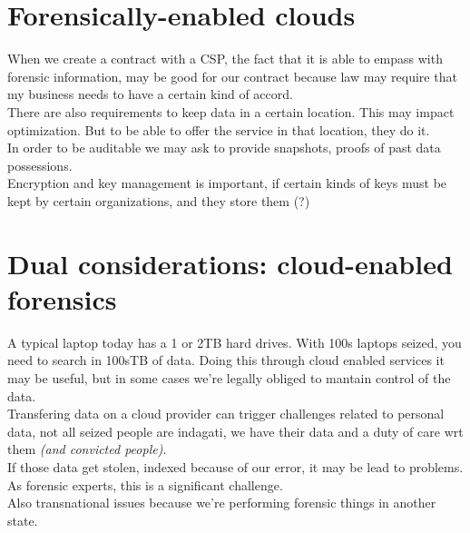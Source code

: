     \section{Forensically-enabled clouds}
        When we create a contract with a CSP, the fact that it is able to empass with forensic information, may be good for our contract because law may require that my business needs to have a certain kind of accord.\\
        There are also requirements to keep data in a certain location. This may impact optimization. But to be able to offer the service in that location, they do it.\\
        In order to be auditable we may ask to provide snapshots, proofs of past data possessions.\\
        Encryption and key management is important, if certain kinds of keys must be kept by certain organizations, and they store them (?)
    \section{Dual considerations: cloud-enabled forensics}
        A typical laptop today has a 1 or 2TB hard drives. With 100s laptops seized, you need to search in 100sTB of data. Doing this through cloud enabled services it may be useful, but in some cases we're legally obliged to mantain control of the data.\\
        Transfering data on a cloud provider can trigger challenges related to personal data, not all seized people are indagati, we have their data and a duty of care wrt them \textit{(and convicted people)}.\\
        If those data get stolen, indexed because of our error, it may be lead to problems.\\
        As forensic experts, this is a significant challenge.\\
        Also transnational issues because we're performing forensic things in another state.